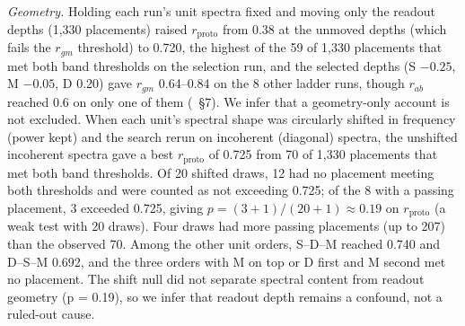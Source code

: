 \textit{Geometry.} Holding each run's unit spectra fixed and moving only the readout depths (1,330 placements)
raised $r_\text{proto}$ from 0.38 at the unmoved depths (which fails the $r_{gm}$ threshold) to 0.720, the highest of the 59 of 1,330 placements that met both band thresholds on the selection run, and the selected depths (S $-0.25$, M $-0.05$, D
0.20) gave $r_{gm}$ 0.64--0.84 on the 8 other ladder runs, though $r_{ab}$ reached 0.6 on only one of them
(~\S7). %
We infer that a geometry-only account is not excluded. When each unit's spectral shape was circularly shifted in
frequency (power kept) and the search rerun on incoherent (diagonal) spectra, the unshifted incoherent spectra gave a best $r_\text{proto}$ of 0.725 from 70 of 1,330 placements that met both band thresholds. Of 20 shifted draws, 12 had no placement meeting both thresholds and were counted as not exceeding 0.725; of the 8 with a passing placement, 3 exceeded 0.725, giving $p = (3+1)/(20+1) \approx 0.19$ on $r_\text{proto}$ (a weak test with 20 draws). Four draws had more passing placements (up to 207) than the observed 70. Among the other unit orders, S--D--M reached 0.740 and D--S--M 0.692, and the three orders with M on
top or D first and M second met no placement. The shift null did not separate spectral content from readout geometry (p = 0.19), so we infer that readout depth remains a
confound, not a ruled-out cause.

